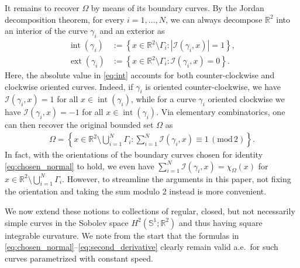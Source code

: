 \documentclass[11pt]{article}
\numberwithin{statement}{section}
\numberwithin{equation}{section}
\theoremstyle{remark}
\newcommand{\R}{\mathbb R} 				%
\newcommand{\Sph}{{\mathbb S}}				%
\begin{document}
It remains to recover $\Omega$ by means of its boundary curves.  By
the Jordan decomposition theorem, for every $i =1, \ldots, N$, we can
always decompose $\R^2$ into an interior of the curve $\gamma_i$ and
an exterior as
  \begin{align} \label{eq:int} \operatorname{int}(\gamma_i) & :=
    \left\{ x\in \R^2\setminus \Gamma_i :
      |\mathcal{I}(\gamma_i,x)| =
                                                              1\right\},\\
    \operatorname{ext}(\gamma_i) & := \left\{ x\in \R^2\setminus
                                   \Gamma_i :
                                   \mathcal{I}(\gamma_i,x) = 0
                                   \right\}.
	\end{align}
        Here, the absolute value in \eqref{eq:int} accounts for both
        counter-clockwise and clockwise oriented curves.  Indeed, if
        $\gamma_i$ is oriented counter-clockwise, we have
        $\mathcal{I}(\gamma_i,x) = 1 $ for all
        $x\in \operatorname{int}(\gamma_i)$, while for a curve
        $\gamma_i$ oriented clockwise we have
        $\mathcal{I}(\gamma_i,x) = -1 $ for all
        $x\in \operatorname{int}(\gamma_i)$.  Via elementary
        combinatorics, one can then recover the original bounded set
        $\Omega$ as
\begin{align}\label{eq:omega_via_winding}
  \Omega = \left\{x \in \R^2\setminus \bigcup_{i=1}^N \Gamma_i:
  \sum_{i=1}^N \mathcal{I}(\gamma_i,x)\equiv 1 \, (\mathrm{mod} \, 2) 
  \right\}.  
\end{align}
In fact, with the orientations of the boundary curves chosen for
identity \eqref{eq:chosen_normal} to hold, we even have
$\sum_{i=1}^N \mathcal{I}(\gamma_i,x) = \chi_\Omega(x)$ for
$x\in \R^2\setminus \bigcup_{i=1}^N \Gamma_i$.  However, to streamline
the arguments in this paper, not fixing the orientation and
taking the sum modulo 2 instead is more convenient.



We now extend these notions to collections of regular, closed, but not
necessarily simple curves in the Sobolev space $H^2(\Sph^1; \R^2)$ and
thus having square integrable curvature. We note from the start that
the formulas in \eqref{eq:chosen_normal}--\eqref{eq:second_derivative}
clearly remain valid a.e.\ for such curves parametrized with constant
speed.
\end{document}

